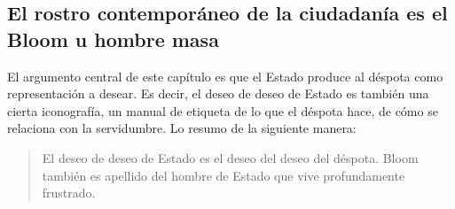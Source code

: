\documentclass[
]{article}
\begin{document}
\hypertarget{el-rostro-contemporuxe1neo-de-la-ciudadanuxeda-es-el-bloom-u-hombre-masa}{%
\subsection{El rostro contemporáneo de la ciudadanía es el Bloom u
hombre
masa}\label{el-rostro-contemporuxe1neo-de-la-ciudadanuxeda-es-el-bloom-u-hombre-masa}}

El argumento central de este capítulo es que el Estado produce al
déspota como representación a desear. Es decir, el deseo de deseo de
Estado es también una cierta iconografía, un manual de etiqueta de lo
que el déspota hace, de cómo se relaciona con la servidumbre. Lo resumo
de la siguiente manera:

\begin{quote}
El deseo de deseo de Estado es el deseo del deseo del déspota. Bloom
también es apellido del hombre de Estado que vive profundamente
frustrado.
\end{quote}
\end{document}
